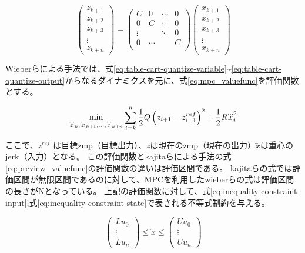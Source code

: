 \begin{equation}
  \begin{pmatrix}
    z_{k+1} \\z_{k+2}\\z_{k+3}\\
    \vdots  \\ z_{k+n}
  \end{pmatrix}
  =
  \begin{pmatrix}
    C      & 0 & \cdots & 0 \\
    0      & C & \cdots & 0 \\
    \vdots &   &    \ddots  & 0 \\
    0 & \cdots & & C\\
  \end{pmatrix}
  \begin{pmatrix}
    x_{k+1} \\x_{k+2}\\x_{k+3}\\
    \vdots  \\ x_{k+n}
  \end{pmatrix}
  \label{eq:mpc-preview-output}
\end{equation}

Wieberらによる手法\cite{WIEBER}では、式\eqref{eq:table-cart-quantize-variable}\textasciitilde\eqref{eq:table-cart-quantize-output}からなるダイナミクスを元に、式\eqref{eq:mpc_valuefunc}を評価関数とする。

\begin{equation}
  \min_{{\buildrel\ldots\over{x}}_{k},{\buildrel\ldots\over{x}}_{k+1},\ldots,{\buildrel\ldots\over{x}}_{k+n}}\sum_{i=k}^{n}{1\over 2}Q\left(z_{i+1}-z_{i+1}^{ref}\right)^{2}+{1\over 2}R{\buildrel\ldots\over{x}}_{i}^{2}
  \label{eq:mpc_valuefunc}
\end{equation}

ここで、$z^{ref}$ は目標zmp（目標出力）、$z$は現在のzmp（現在の出力）$\dddot{x}$は重心のjerk（入力）となる。
この評価関数とkajitaらによる手法の式\eqref{eq:preview_valuefunc}の評価関数の違いは評価区間である。
kajitaらの式では評価区間が無限区間であるのに対して、MPCを利用したwieberらの式は評価区間の長さがNとなっている。
上記の評価関数に対して、式\eqref{eq:inequality-constraint-input},式\eqref{eq:inequality-constraint-state}で表される不等式制約を与える。

\begin{equation}
  \begin{pmatrix}
    Lu_{0} \\ \vdots \\ Lu_{n}
  \end{pmatrix}
  \leq \dddot{x} \leq
  \begin{pmatrix}
    Uu_{0} \\ \vdots \\ Uu_{n}
  \end{pmatrix}
  \label{eq:inequality-constraint-input}
\end{equation}

